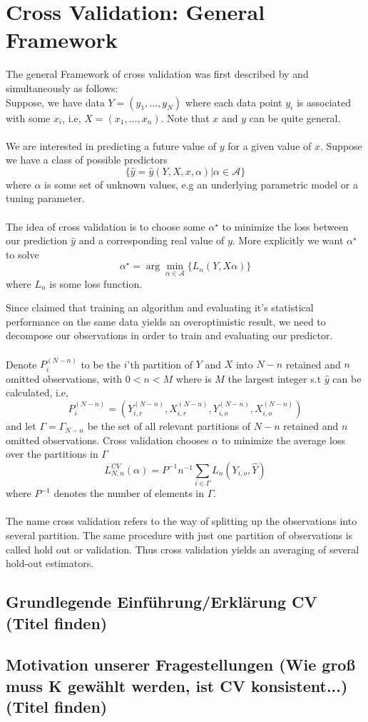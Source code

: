 \documentclass[Research_Module_ES.tex]{subfiles}
\begin{document}
\section{Cross Validation: General Framework}
The general Framework of cross validation was first described by \cite{stone1974cross} and simultaneously \cite{geisser1975predictive} as follows: \\

Suppose, we have data $Y=(y_1,\ldots,y_N)$ where each data point $y_i$ is associated with some $x_i$, i.e, $X=(x_1,\ldots,x_n)$. Note that $x$ and $y$ can be quite general.\\
\\
We are interested in predicting a future value of $y$ for a given value of $x$. Suppose we have a class of possible predictors 
\[
	\{\hat{y}=\hat{y}(Y,X,x,\alpha)|\alpha\in\mathscr{A}\}
\]
where $\alpha$ is some set of unknown values, e.g an underlying parametric model or a tuning parameter.\\
\\
The idea of cross validation is to choose some $\alpha^\star$ to minimize the loss between our prediction $\hat{y}$ and a corresponding real value of $y$. More explicitly we want $\alpha^\star$ to solve
\[
	\alpha^\star=\arg\min_{\alpha\in\mathscr{A}}\{L_n(Y,X\alpha)\}
\]
where $L_n$ is some loss function.
 
Since \cite{larson1931shrinkage} claimed that training an algorithm and evaluating it's statistical performance on the same data yields an overoptimistic result, we need to decompose our observations in order to train and evaluating our predictor. \\
\\
Denote $P^{(N-n)}_i$ to be the $i$'th partition of $Y$ and $X$ into $N-n$ retained and $n$ omitted observations, with $0<n<M$ where is $M$ the largest integer s.t $\hat{y}$ can be calculated, i.e,
\[
	P^{(N-n)}_i=(Y_{i,r}^{(N-n)},X_{i,r}^{(N-n)},Y_{i,o}^{(N-n)},X_{i,o}^{(N-n)})
\]
and let $\Gamma=\Gamma_{N-n}$ be the set of all relevant partitions of $N-n$ retained and $n$ omitted observations. Cross validation chooses $\alpha$ to minimize the average loss over the partitions in $\Gamma$ 
\[
	L_{N,n}^{CV}(\alpha)=P^{-1}n^{-1}\sum_{i\in\Gamma}L_n(Y_{i,o},\hat{Y})
\]
where $P^{-1}$ denotes the number of elements in $\Gamma$.\\
\\
The name cross validation refers to the way of splitting up the observations into several partition. The same procedure with just one partition of observations is called hold out or validation. Thus cross validation yields an averaging of several hold-out estimators.







\subsection{Grundlegende Einführung/Erklärung CV (Titel finden)}
\subsection{Motivation unserer Fragestellungen (Wie groß muss K gewählt werden, ist CV konsistent...)(Titel finden)}
\end{document}
